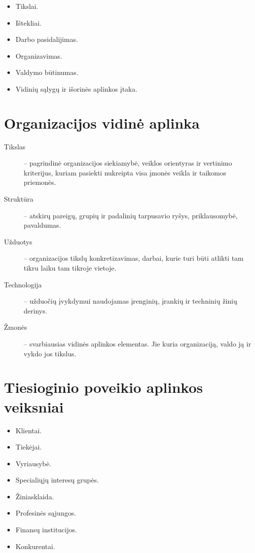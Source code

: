 \begin{itemize}
  \item Tikslai.
  \item Ištekliai.
  \item Darbo pasidalijimas.
  \item Organizavimas.
  \item Valdymo būtinumas.
  \item Vidinių sąlygų ir išorinės aplinkos įtaka.
\end{itemize}

\section{Organizacijos vidinė aplinka}

\begin{description}
  \item[Tikslas] – pagrindinė organizacijos siekiamybė, veiklos orientyras
    ir vertinimo kriterijus, kuriam pasiekti nukreipta visa įmonės veikla
    ir taikomos priemonės.
  \item[Struktūra] – atskirų pareigų, grupių ir padalinių tarpusavio
    ryšys, priklausomybė, pavaldumas.
  \item[Užduotys] – organizacijos tikslų konkretizavimas, darbai, kurie
    turi būti atlikti tam tikru laiku tam tikroje vietoje.
  \item[Technologija] – užduočių įvykdymui naudojamas įrenginių, įrankių
    ir techninių žinių derinys.
  \item[Žmonės] – svarbiausias vidinės aplinkos elementas. Jie kuria
    organizaciją, valdo ją ir vykdo jos tikslus.
\end{description}

\section{Tiesioginio poveikio aplinkos veiksniai}

\begin{itemize}
  \item Klientai.
  \item Tiekėjai.
  \item Vyriausybė.
  \item Specialiųjų interesų grupės.
  \item Žiniasklaida.
  \item Profesinės sąjungos.
  \item Finansų institucijos.
  \item Konkurentai.
\end{itemize}

